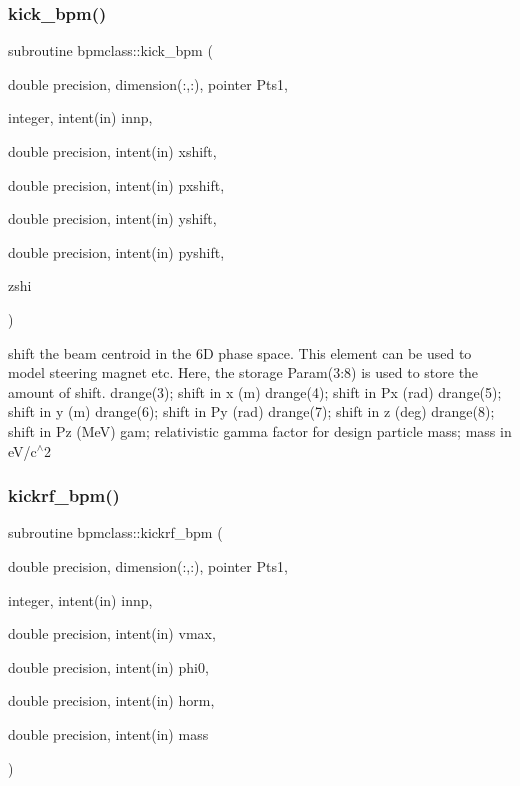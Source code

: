 \mbox{\label{namespacebpmclass_a5c6269e3b899045a35e2bda31ac57c9b}} 
\subsubsection{\texorpdfstring{kick\_bpm()}{kick\_bpm()}}
{\footnotesize\ttfamily subroutine bpmclass\+::kick\+\_\+bpm (\begin{DoxyParamCaption}\item[{double precision, dimension(\+:,\+:), pointer}]{Pts1,  }\item[{integer, intent(in)}]{innp,  }\item[{double precision, intent(in)}]{xshift,  }\item[{double precision, intent(in)}]{pxshift,  }\item[{double precision, intent(in)}]{yshift,  }\item[{double precision, intent(in)}]{pyshift,  }\item[{}]{zshi }\end{DoxyParamCaption})}



shift the beam centroid in the 6D phase space. This element can be used to model steering magnet etc. Here, the storage Param(3\+:8) is used to store the amount of shift. drange(3); shift in x (m) drange(4); shift in Px (rad) drange(5); shift in y (m) drange(6); shift in Py (rad) drange(7); shift in z (deg) drange(8); shift in Pz (MeV) gam; relativistic gamma factor for design particle mass; mass in e\+V/c$^\wedge$2 

\mbox{\label{namespacebpmclass_aee456e0f63daad3cb6eaba1bc99c948f}} 
\subsubsection{\texorpdfstring{kickrf\_bpm()}{kickrf\_bpm()}}
{\footnotesize\ttfamily subroutine bpmclass\+::kickrf\+\_\+bpm (\begin{DoxyParamCaption}\item[{double precision, dimension(\+:,\+:), pointer}]{Pts1,  }\item[{integer, intent(in)}]{innp,  }\item[{double precision, intent(in)}]{vmax,  }\item[{double precision, intent(in)}]{phi0,  }\item[{double precision, intent(in)}]{horm,  }\item[{double precision, intent(in)}]{mass }\end{DoxyParamCaption})}



